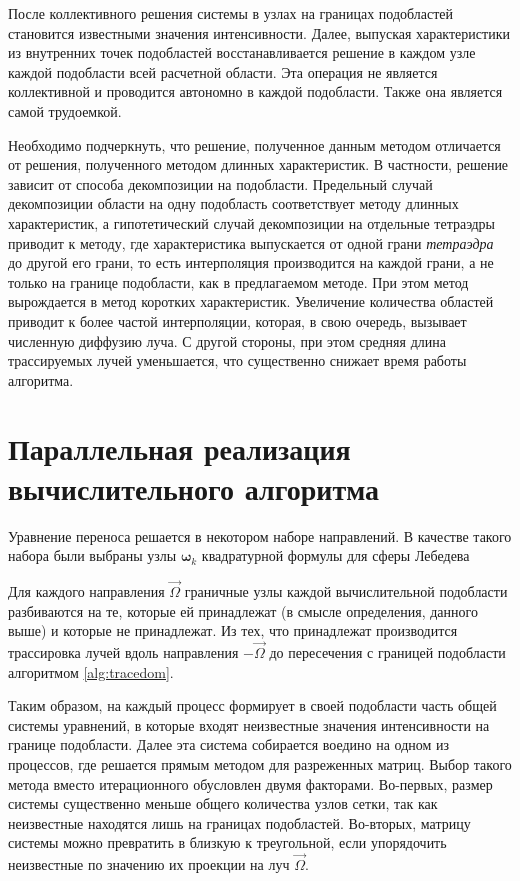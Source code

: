 После коллективного решения системы в узлах на границах подобластей становится известными значения интенсивности. Далее, выпуская характеристики из внутренних точек подобластей восстанавливается решение в каждом узле каждой подобласти всей расчетной области. Эта операция не является коллективной и проводится автономно в каждой подобласти. Также она является самой трудоемкой.

Необходимо подчеркнуть, что решение, полученное данным методом отличается от решения, полученного методом длинных характеристик. В частности, решение зависит от способа декомпозиции на подобласти. Предельный случай декомпозиции области на одну подобласть соответствует методу длинных характеристик, а гипотетический случай декомпозиции на отдельные тетраэдры приводит к методу, где характеристика выпускается от одной грани \emph{тетраэдра} до другой его грани, то есть интерполяция производится на каждой грани, а не только на границе подобласти, как в предлагаемом методе. При этом метод вырождается в метод коротких характеристик. Увеличение количества областей приводит к более частой интерполяции, которая, в свою очередь, вызывает численную диффузию луча. С другой стороны, при этом средняя длина трассируемых лучей уменьшается, что существенно снижает время работы алгоритма.

\section{Параллельная реализация вычислительного алгоритма}

Уравнение переноса решается в некотором наборе направлений. В качестве такого набора были выбраны узлы $\boldsymbol{\omega}_k$ квадратурной формулы для сферы Лебедева 

Для каждого направления $\vec \Omega$ граничные узлы каждой вычислительной подобласти разбиваются на те, которые ей принадлежат (в смысле определения, данного выше) и которые не принадлежат. Из тех, что принадлежат производится трассировка лучей вдоль направления $-\vec \Omega$ до пересечения с границей подобласти алгоритмом \ref{alg:tracedom}.

Таким образом, на каждый процесс формирует в своей подобласти часть общей системы уравнений, в которые входят неизвестные значения интенсивности на границе подобласти.
Далее эта система собирается воедино на одном из процессов, где решается прямым методом для разреженных матриц. Выбор такого метода вместо итерационного обусловлен двумя факторами. Во-первых, размер системы существенно меньше общего количества узлов сетки, так как неизвестные находятся лишь на границах подобластей. Во-вторых, матрицу системы можно превратить в близкую к треугольной, если упорядочить неизвестные по значению их проекции на луч $\vec \Omega$.

